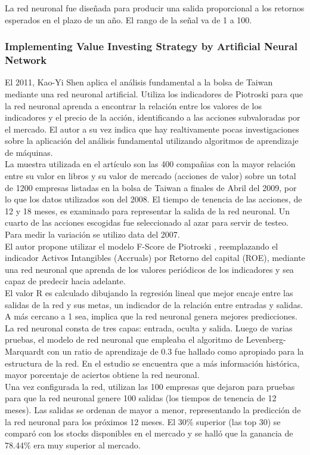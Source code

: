 La red neuronal fue diseñada para producir una salida proporcional a los retornos esperados en el plazo de un año. El rango de la señal va de 1 a 100.\\


\subsubsection{Implementing Value Investing Strategy by Artificial Neural Network}

El 2011, Kao-Yi Shen \cite{Shen2011} aplica el an\'alisis fundamental a la bolsa de Taiwan mediante una red neuronal artificial. Utiliza los indicadores de Piotroski \cite{Piotroski2000} para que la red neuronal aprenda a encontrar la relación entre los valores de los indicadores y el precio de la acción, identificando a las acciones subvaloradas por el mercado. El autor a su vez indica que hay realtivamente pocas investigaciones sobre la aplicaci\'on del an\'alisis fundamental utilizando algoritmos de aprendizaje de m\'aquinas.\\

La muestra utilizada en el artículo son las 400 compañias con la mayor relación entre su valor en libros y su valor de mercado (acciones de valor) sobre un total de 1200 empresas listadas en la bolsa de Taiwan a finales de Abril del 2009, por lo que los datos utilizados son del 2008. El tiempo de tenencia de las acciones, de 12 y 18 meses, es examinado para representar la salida de la red neuronal. Un cuarto de las acciones escogidas fue seleccionado al azar para servir de testeo. Para medir la variación se utilizo data del 2007.\\

El autor propone utilizar el modelo F-Score de Piotroski \cite{Piotroski2000}, reemplazando el indicador Activos Intangibles (Accruals) por Retorno del capital (ROE), mediante una red neuronal que aprenda de los valores periódicos de los indicadores y sea capaz de predecir hacia adelante.\\

El valor R es calculado dibujando la regresión lineal que mejor encaje entre las salidas de la red y sus metas, un indicador de la relación entre entradas y salidas. A más cercano a 1 sea, implica que la red neuronal genera mejores predicciones.\\

La red neuronal consta de tres capas: entrada, oculta y salida. Luego de varias pruebas, el modelo de red neuronal que empleaba el algoritmo de Levenberg-Marquardt con un ratio de aprendizaje de 0.3 fue hallado como apropiado para la estructura de la red. En el estudio se encuentra que a más información histórica, mayor porcentaje de aciertos obtiene la red neuronal.\\

Una vez configurada la red, utilizan las 100 empresas que dejaron para pruebas para que la red neuronal genere 100 salidas (los tiempos de tenencia de 12 meses). Las salidas se ordenan de mayor a menor, representando la predicción de la red neuronal para los próximos 12 meses. El 30\% superior (las top 30) se comparó con los stocks disponibles en el mercado y se halló que la ganancia de 78.44\% era muy superior al mercado.\\